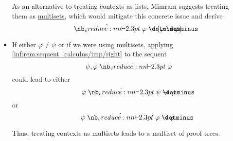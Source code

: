 \begin{example}
\begin{itemize}
    As an alternative to treating contexts as lists, Mimram suggests treating them as \hyperref[def:multiset]{multisets}, which would mitigate this concrete issue and derive
    \begin{equation*}
      \synvdash \varphi \synimplies (\varphi \synimplies \varphi).
    \end{equation*}

    \item If either \( \varphi \neq \psi \) or if we were using multisets, applying \ref{inf:rem:sequent_calculus/imp/right} to the sequent
    \begin{equation*}
      \psi, \varphi \synvdash \varphi
    \end{equation*}
    could lead to either
    \begin{equation*}
      \varphi \synvdash \psi \synimplies \varphi
    \end{equation*}
    or
    \begin{equation*}
      \psi \synvdash \varphi \synimplies \varphi.
    \end{equation*}

    Thus, treating contexts as multisets leads to a multiset of proof trees.
  \end{itemize}
\end{example}

